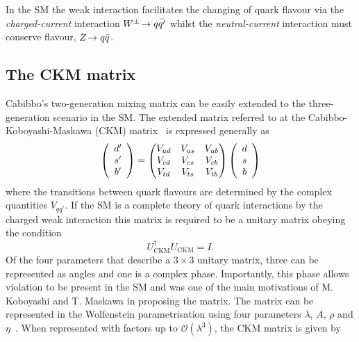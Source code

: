 In the SM the weak interaction facilitates the changing of quark flavour via the \emph{charged-current} interaction ${W^\pm}\!\rightarrow q\bar{q'}$ whilst the \emph{neutral-current} interaction must conserve flavour, ${Z}\!\rightarrow q\bar{q}$. 


\subsection{The CKM matrix}
Cabibbo's two-generation mixing matrix can be easily extended to the three-generation scenario in the SM. The extended matrix referred to at the Cabibbo-Koboyashi-Maskawa (CKM) matrix~\cite{CKM} is expressed generally as 
\begin{equation}
\left( \begin{array}{c} d' \\ s'  \\ b' \end{array} \right) = \begin{pmatrix} {\ensuremath{V_{{u}{d}}}} & {V_{{u}{s}}} & {V_{{u}{b}}} \\ {V_{{c}{d}}} & {V_{{c}{s}}} & {V_{{c}{b}}}  \\ {V_{{t}{d}}} & {V_{{t}{s}}} & {V_{{t}{b}}} \end{pmatrix} \left( \begin{array}{c} d \\ s  \\ b \end{array} \right)
\end{equation}
where the transitions between quark flavours are determined by the complex quantities $V_{qq'}$. 
If the SM is a complete theory of quark interactions by the charged weak interaction this matrix is required to be a unitary matrix obeying the condition
\begin{equation}
U_{\text{CKM}}^\dag U_{\text{CKM}} = I.
\end{equation}
Of the four parameters that describe a $3\times3$ unitary matrix, three can be represented as angles and one is a complex phase. Importantly, this phase allows \CP violation to be present in the SM and was one of the main motivations of M. Koboyashi and T. Maskawa in proposing the matrix.
The matrix can be represented in the Wolfenstein parametrisation using four parameters $\lambda$, $A$, $\rho$ and $\eta$~\cite{PhysRevLett.51.1945}. When represented with factors up to $\mathcal{O}(\lambda^{3})$, the CKM matrix is given by 
